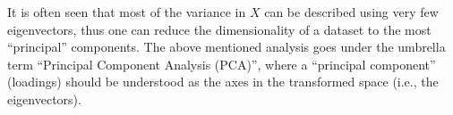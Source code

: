 It is often seen that most of the variance in $X$ can be described using very few eigenvectors, thus one can reduce the dimensionality of a dataset to the most ``principal'' components.
The above mentioned analysis goes under the umbrella term ``Principal Component Analysis (PCA)'', where a ``principal component'' (loadings) should be understood as the axes in the transformed space (i.e., the eigenvectors).
